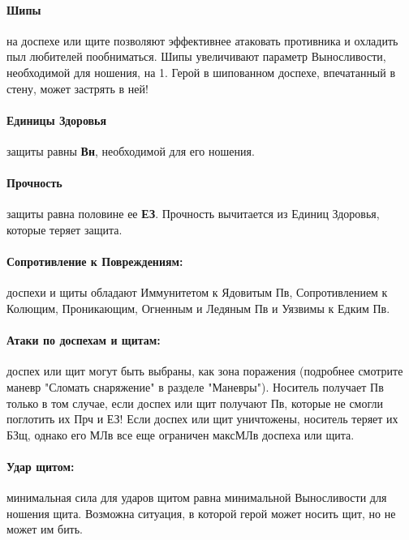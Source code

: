 \paragraph{Шипы} на доспехе или щите позволяют эффективнее атаковать противника и охладить пыл любителей пообниматься. Шипы увеличивают параметр Выносливости, необходимой для ношения, на 1. Герой в шипованном доспехе, впечатанный в стену, может застрять в ней!
\paragraph{Единицы Здоровья} защиты равны \textbf{Вн}, необходимой для его ношения.
\paragraph{Прочность} защиты равна половине ее \textbf{ЕЗ}. Прочность вычитается из Единиц Здоровья, которые теряет защита.
\paragraph{Сопротивление к Повреждениям:} доспехи и щиты обладают Иммунитетом к Ядовитым Пв, Сопротивлением к Колющим, Проникающим, Огненным и Ледяным Пв и Уязвимы к Едким Пв.
\paragraph{Атаки по доспехам и щитам:} доспех или щит могут быть выбраны, как зона поражения (подробнее смотрите маневр "Сломать снаряжение" в разделе "Маневры"). Носитель получает Пв только в том случае, если доспех или щит получают Пв, которые не смогли поглотить их Прч и ЕЗ! Если доспех или щит уничтожены, носитель теряет их БЗщ, однако его МЛв все еще ограничен максМЛв доспеха или щита.
\paragraph{Удар щитом:} минимальная сила для ударов щитом равна минимальной Выносливости для ношения щита. Возможна ситуация, в которой герой может носить щит, но не может им бить.
